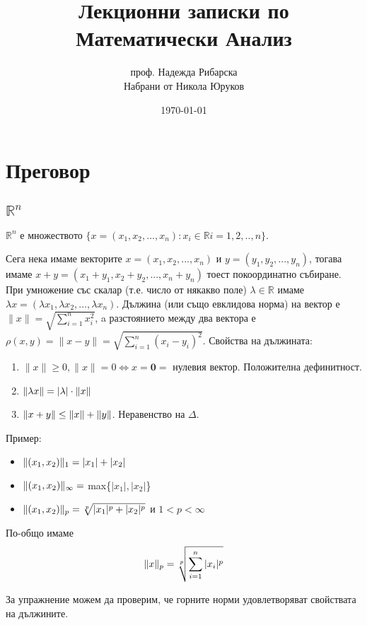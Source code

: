 \documentclass[11pt]{article}
\title{Лекционни записки по Математически Анализ}
\author{проф. Надежда Рибарска \\ Набрани от Никола Юруков}
\date{\today}
\numberwithin{equation}{section}
\numberwithin{figure}{section}
\numberwithin{table}{section}
\theoremstyle{plain}
\theoremstyle{definition}
\theoremstyle{remark}
\theoremstyle{definition}
\theoremstyle{remark}
\theoremstyle{plain}
\theoremstyle{definition}
\theoremstyle{definition}
\theoremstyle{plain}
\theoremstyle{plain}
\theoremstyle{plain}
\theoremstyle{definition}
\theoremstyle{plain}
\DeclarePairedDelimiter\norm{\lVert}{\rVert}
\renewcommand*{\Vec}[1]{\mathbf{#1}}
\newcommand*{\Z}{\Vec{0}}
\begin{document}
\maketitle

\clearpage

\tableofcontents

\clearpage

\section{Преговор}

\subsection{$\mathbb{R}^n$}

$\mathbb{R}^n$ е множеството $\{x = (x_1, x_2, ..., x_n): x_i \in \mathbb{R} i=1,2,..,n\}$.

Сега нека имаме векторите $x = (x_1, x_2, ..., x_n)$ и $y = (y_1, y_2, ..., y_n)$, тогава имаме $x+y = (x_1+y_1, x_2+y_2, ..., x_n + y_n)$ тоест покоординатно събиране. При умножение със скалар (т.е. число от някакво поле) $\lambda \in \mathbb{R}$ имаме $\lambda x = (\lambda x_1, \lambda x_2, ..., \lambda x_n)$. Дължина (или също евклидова норма) на вектор е $\lVert x\rVert = \sqrt{\sum_{i=1}^n x_i^2}$, a разстоянието между два вектора е $\rho(x,y) = \lVert x - y \rVert = \sqrt{\sum_{i=1}^n (x_i - y_i)^2}$. Свойства на дължината:
\begin{enumerate}
	\item $\lVert x \rVert \geq 0, \lVert x \rVert = 0 \iff x=\Z=$ нулевия вектор. Положителна дефинитност.
	\item $\norm{\lambda x} = |\lambda|\cdot \norm{x}$
	\item $\norm{x+y} \leq \norm{x} + \norm{y}$. Неравенство на $\Delta$.
\end{enumerate}

Пример:
\begin{itemize}
 \item $\norm{(x_1, x_2)}_1 = |x_1| + |x_2|$
 \item $\norm{(x_1, x_2)}_\infty = $ max\{$|x_1|, |x_2|$\}
 \item $\norm{(x_1, x_2)}_p = \sqrt[p]{|x_1|^p + |x_2|^p}$ и $1<p<\infty$
\end{itemize}
По-общо имаме $$\norm{x}_p = \sqrt[p]{\sum_{i=1}^n |x_i|^p}$$

За упражнение можем да проверим, че горните норми удовлетворяват свойствата на дължините.
\end{document}
